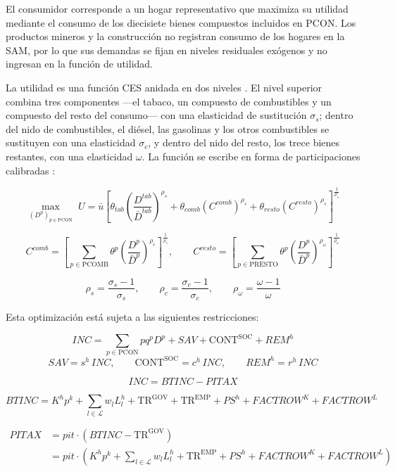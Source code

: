 \documentclass[11pt]{article}
\begin{document}
El consumidor corresponde a un hogar representativo que maximiza su utilidad mediante el consumo de los diecisiete bienes compuestos incluidos en \(\mathrm{PCON}\). Los productos mineros y la construcción no registran consumo de los hogares en la SAM, por lo que sus demandas se fijan en niveles residuales exógenos y no ingresan en la función de utilidad.

La utilidad es una función CES anidada en dos niveles \cite{keller_1976,perroni_rutherford_1995}. El nivel superior combina tres componentes ---el tabaco, un compuesto de combustibles y un compuesto del resto del consumo--- con una elasticidad de sustitución $\sigma_{s}$; dentro del nido de combustibles, el diésel, las gasolinas y los otros combustibles se sustituyen con una elasticidad $\sigma_{c}$, y dentro del nido del resto, los trece bienes restantes, con una elasticidad $\omega$. La función se escribe en forma de participaciones calibradas \cite{rutherford_1995}:

\[
\max_{\left(D^{p}\right)_{p \in \mathrm{PCON}}} \;
U = \bar{u}\left[\theta_{tab}\left(\frac{D^{tab}}{\bar{D}^{tab}}\right)^{\rho_{s}}
+\theta_{comb}\left(C^{comb}\right)^{\rho_{s}}
+\theta_{resto}\left(C^{resto}\right)^{\rho_{s}}\right]^{\frac{1}{\rho_{s}}}
\]

\[
C^{comb}=\left[\sum_{p\in\mathrm{PCOMB}}\theta^{p}\left(\frac{D^{p}}{\bar{D}^{p}}\right)^{\rho_{c}}\right]^{\frac{1}{\rho_{c}}},
\qquad
C^{resto}=\left[\sum_{p\in\mathrm{PRESTO}}\theta^{p}\left(\frac{D^{p}}{\bar{D}^{p}}\right)^{\rho_{\omega}}\right]^{\frac{1}{\rho_{\omega}}}
\]

\[
\rho_{s}=\frac{\sigma_{s}-1}{\sigma_{s}},\qquad
\rho_{c}=\frac{\sigma_{c}-1}{\sigma_{c}},\qquad
\rho_{\omega}=\frac{\omega-1}{\omega}
\]

Esta optimización está sujeta a las siguientes restricciones:

\[
INC = \sum_{p \in \mathrm{PCON}} pq^{p} D^{p} + SAV + \mathrm{CONT}^{\mathrm{SOC}} + REM^{h}
\]
\[
SAV = s^{h}\, INC, \qquad \mathrm{CONT}^{\mathrm{SOC}} = c^{h}\, INC, \qquad REM^{h} = r^{h}\, INC
\]

\[
INC = BTINC - PITAX
\]

\[
BTINC = K^{h} p^{k} + \sum_{l\in\mathcal{L}} w_{l} L^{h}_{l} + \mathrm{TR}^{\mathrm{GOV}} + \mathrm{TR}^{\mathrm{EMP}} + PS^{h} + FACTROW^{K} + FACTROW^{L}
\]

\[
\begin{aligned}
PITAX &= pit \cdot \left(BTINC - \mathrm{TR}^{\mathrm{GOV}}\right)\\
&= pit \cdot \left(K^{h} p^{k} + \sum_{l\in\mathcal{L}} w_{l} L^{h}_{l} + \mathrm{TR}^{\mathrm{EMP}} + PS^{h} + FACTROW^{K} + FACTROW^{L}\right)
\end{aligned}
\]
\end{document}
